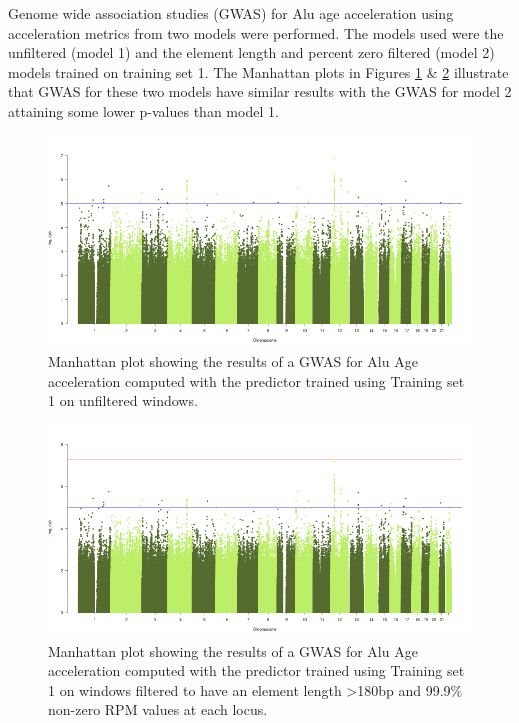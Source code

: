 \documentclass[
]{book}
\begin{document}
Genome wide association studies (GWAS) for Alu age acceleration using acceleration metrics from two models were performed.
The models used were the unfiltered (model 1) and the element length and percent zero filtered (model 2) models trained on training set 1.
The Manhattan plots in Figures \ref{fig:m1manhat} \& \ref{fig:m2manhat} illustrate that GWAS for these two models have similar results with the GWAS for model 2 attaining some lower p-values than model 1.

\begin{figure}

{\centering \includegraphics[width=1\linewidth]{./figs/manhat_m1_v3} 

}

\caption{Manhattan plot showing the results of a GWAS for Alu Age acceleration computed with the predictor trained using Training set 1 on unfiltered windows.}\label{fig:m1manhat}
\end{figure}



\begin{figure}

{\centering \includegraphics[width=1\linewidth]{./figs/manhat_m2_v3} 

}

\caption{Manhattan plot showing the results of a GWAS for Alu Age acceleration computed with the predictor trained using Training set 1 on windows filtered to have an element length \textgreater180bp and 99.9\% non-zero RPM values at each locus.}\label{fig:m2manhat}
\end{figure}
\end{document}
